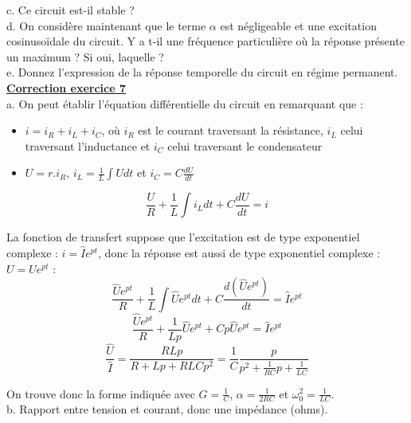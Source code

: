 \documentclass[11pt]{report}
\begin{document}
 	c. Ce circuit est-il stable ?\\
 	
 	d. On considère maintenant que le terme $\alpha$ est négligeable et une excitation cosinusoïdale du circuit. Y a t-il une fréquence particulière où la réponse présente un maximum ? Si oui, laquelle ? \\
 	
 	e. Donnez l'expression de la réponse temporelle du circuit en régime permanent.\\
 	
 	\textbf{\underline{Correction exercice 7}}\\
 	
 	a. On peut établir l'équation différentielle du circuit en remarquant que :
 	\begin{itemize}
 		\item $i=i_R+i_L+i_C$, où $i_R$ est le courant traversant la résistance, $i_L$ celui traversant l'inductance et $i_C$ celui traversant le condensateur
 		\item $U=r.i_R$, $i_L=\frac{1}{L}\int U dt$ et $i_C=C\frac{dU}{dt}$
 	\end{itemize} 
 	
 	\begin{equation*}
 	\frac{U}{R}+\frac{1}{L}\int i_L dt+C\frac{dU}{dt}=i
 	\end{equation*}
 	
 	La fonction de transfert suppose que l'excitation est de type exponentiel complexe : $i=\hat{I}e^{pt}$, donc la réponse est aussi de type exponentiel complexe : $U=\hat{U}e^{pt}$ :
 	\begin{equation*}
 	\frac{\hat{U}e^{pt}}{R}+\frac{1}{L}\int \hat{U}e^{pt} dt+C\frac{d(\hat{U}e^{pt})}{dt}=\hat{I}e^{pt}
 	\end{equation*}
 	\begin{equation*}
 	\frac{\hat{U}e^{pt}}{R}+\frac{1}{Lp}\hat{U}e^{pt}+Cp\hat{U}e^{pt}=\hat{I}e^{pt}
 	\end{equation*}
 	\begin{equation*}
 	\frac{\hat{U}}{\hat{I}}=\frac{RLp}{R+Lp+RLCp^2}=\frac{1}{C}\frac{p}{p^2+\frac{1}{RC}p+\frac{1}{LC}}
 	\end{equation*}
 	
 	On trouve donc la forme indiquée avec $G=\frac{1}{C}$, $\alpha=\frac{1}{2RC}$ et $\omega_0^2=\frac{1}{LC}$.\\
 	
 	b. Rapport entre tension et courant, donc une impédance (ohms).\\
 	
\end{document}
